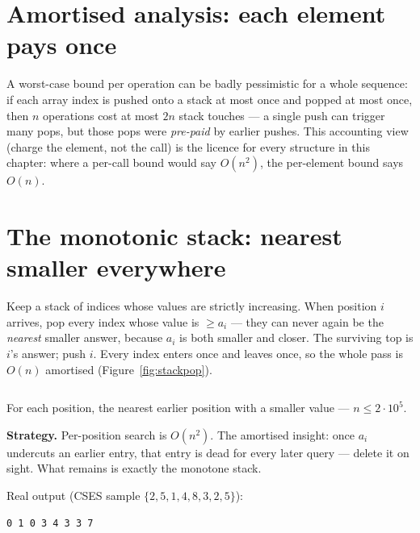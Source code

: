 \section{Amortised analysis: each element pays once}\label{sec:amort}

A worst-case bound per operation can be badly pessimistic for a whole
sequence: if each array index is pushed onto a stack at most once and
popped at most once, then $n$ operations cost at most $2n$ stack
touches --- a single push can trigger many pops, but those pops were
\emph{pre-paid} by earlier pushes. This accounting view (charge the
element, not the call) is the licence for every structure in this
chapter: where a per-call bound would say $O(n^2)$, the per-element
bound says $O(n)$.

\section{The monotonic stack: nearest smaller everywhere}\label{sec:monostack}

Keep a stack of indices whose values are strictly increasing. When
position $i$ arrives, pop every index whose value is $\ge a_i$ ---
they can never again be the \emph{nearest} smaller answer, because
$a_i$ is both smaller and closer. The surviving top is $i$'s answer;
push $i$. Every index enters once and leaves once, so the whole pass
is $O(n)$ amortised (Figure~\ref{fig:stackpop}).

\begin{lstlisting}[language=C++,caption={\texttt{monostack.h}: nearest
smaller to the left, and mirrored right.},label={lst:monostack}]
\end{lstlisting}


\begin{example}\label{ex:nsv}
For each position, the nearest earlier position with a smaller value
--- $n \le 2\cdot10^5$.
\par\smallskip
\textbf{Strategy.} Per-position search is $O(n^2)$. The amortised
insight: once $a_i$ undercuts an earlier entry, that entry is dead for
every later query --- delete it on sight. What remains is exactly the
monotone stack.
\par\smallskip
\begin{solution}

Real output (CSES sample $\{2,5,1,4,8,3,2,5\}$):
\begin{lstlisting}[numbers=none]
0 1 0 3 4 3 3 7
\end{lstlisting}
\end{solution}
\end{example}


